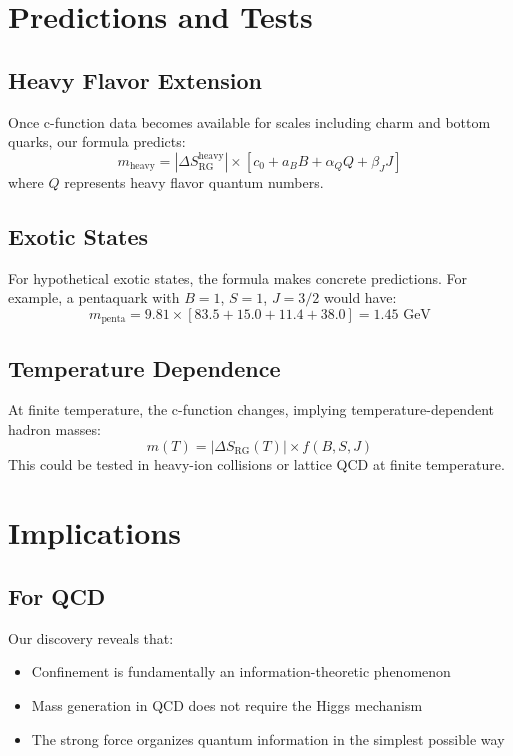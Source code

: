 \documentclass[12pt,a4paper]{article}
\begin{document}
\section{Predictions and Tests}

\subsection{Heavy Flavor Extension}

Once c-function data becomes available for scales including charm and bottom quarks, our formula predicts:
\begin{equation}
m_{\text{heavy}} = |\Delta S_{\text{RG}}^{\text{heavy}}| \times [c_0 + a_B B + \alpha_Q Q + \beta_J J]
\end{equation}
where $Q$ represents heavy flavor quantum numbers.

\subsection{Exotic States}

For hypothetical exotic states, the formula makes concrete predictions. For example, a pentaquark with $B=1$, $S=1$, $J=3/2$ would have:
\begin{equation}
m_{\text{penta}} = 9.81 \times [83.5 + 15.0 + 11.4 + 38.0] = 1.45 \text{ GeV}
\end{equation}

\subsection{Temperature Dependence}

At finite temperature, the c-function changes, implying temperature-dependent hadron masses:
\begin{equation}
m(T) = |\Delta S_{\text{RG}}(T)| \times f(B,S,J)
\end{equation}
This could be tested in heavy-ion collisions or lattice QCD at finite temperature.

\section{Implications}

\subsection{For QCD}

Our discovery reveals that:
\begin{itemize}
\item Confinement is fundamentally an information-theoretic phenomenon
\item Mass generation in QCD does not require the Higgs mechanism
\item The strong force organizes quantum information in the simplest possible way
\end{itemize}
\end{document}
